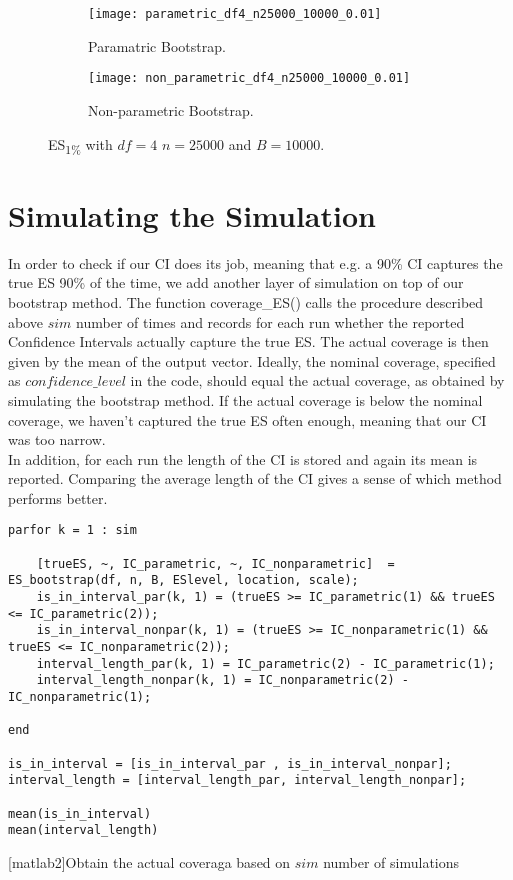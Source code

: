 \documentclass[11pt, a4paper]{article}
\begin{document}
	\begin{figure}[!htb]
		\centering 
		\begin{subfigure}{.4\linewidth}
			\centering
			\texttt{[image: parametric\_df4\_n25000\_10000\_0.01]}
		\caption{\footnotesize Paramatric Bootstrap.}
		\label{fig7a}
		\end{subfigure} %
		\begin{subfigure}{.4\linewidth}
			\centering
			\texttt{[image: non\_parametric\_df4\_n25000\_10000\_0.01]}
			\caption{\footnotesize Non-parametric Bootstrap.}
			\label{fig7b}
		\end{subfigure}
		\caption{\footnotesize ES\textsubscript{1\%} with $df=4$ $n=25000$ and $B=10000$.}
		\label{fig7}
	\end{figure}


\section{Simulating the Simulation}
In order to check if our CI does its job, meaning that e.g. a 90\% CI captures the true ES 90\% of the time, we add another layer of simulation on top of our bootstrap method. The function coverage\_ES() calls the procedure described above $sim$ number of times and records for each run whether the reported Confidence Intervals actually capture the true ES. The actual coverage is then given by the mean of the output vector. Ideally, the nominal coverage, specified as $confidence\_level$ in the code, should equal the actual coverage, as obtained by simulating the bootstrap method. If the actual coverage is below the nominal coverage, we haven't captured the true ES often enough, meaning that our CI was too narrow.\\

In addition, for each run the length of the CI is stored and again its mean is reported. Comparing the average length of the CI gives a sense of which method performs better.\\

\begin{lstlisting}[style=Matlab-editor]
parfor k = 1 : sim

	[trueES, ~, IC_parametric, ~, IC_nonparametric]  = ES_bootstrap(df, n, B, ESlevel, location, scale);
	is_in_interval_par(k, 1) = (trueES >= IC_parametric(1) && trueES <= IC_parametric(2));
	is_in_interval_nonpar(k, 1) = (trueES >= IC_nonparametric(1) && trueES <= IC_nonparametric(2));       
	interval_length_par(k, 1) = IC_parametric(2) - IC_parametric(1);
	interval_length_nonpar(k, 1) = IC_nonparametric(2) - IC_nonparametric(1);

end

is_in_interval = [is_in_interval_par , is_in_interval_nonpar];
interval_length = [interval_length_par, interval_length_nonpar];

mean(is_in_interval)
mean(interval_length)
\end{lstlisting}
\label{Coverage function}
[matlab2]{Obtain the actual coveraga based on $sim$ number of simulations\\}
\end{document}
